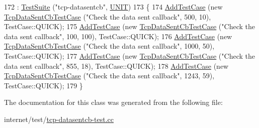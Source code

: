 \begin{DoxyCode}
172     : \hyperlink{classns3_1_1TestSuite_a904b0c40583b744d30908aeb94636d1a}{TestSuite} (\textcolor{stringliteral}{"tcp-datasentcb"}, \hyperlink{classns3_1_1TestSuite_a1ebfcab34ec8161e085e8e3a1855eae0a3885375a3787abf60431f8454b3cadbd}{UNIT})
173   \{
174     \hyperlink{classns3_1_1TestCase_a3718088e3eefd5d6454569d2e0ddd835}{AddTestCase} (\textcolor{keyword}{new} \hyperlink{classTcpDataSentCbTestCase}{TcpDataSentCbTestCase} (\textcolor{stringliteral}{"Check the data sent callback"},
       500, 10), TestCase::QUICK);
175     \hyperlink{classns3_1_1TestCase_a3718088e3eefd5d6454569d2e0ddd835}{AddTestCase} (\textcolor{keyword}{new} \hyperlink{classTcpDataSentCbTestCase}{TcpDataSentCbTestCase} (\textcolor{stringliteral}{"Check the data sent callback"},
       100, 100), TestCase::QUICK);
176     \hyperlink{classns3_1_1TestCase_a3718088e3eefd5d6454569d2e0ddd835}{AddTestCase} (\textcolor{keyword}{new} \hyperlink{classTcpDataSentCbTestCase}{TcpDataSentCbTestCase} (\textcolor{stringliteral}{"Check the data sent callback"},
       1000, 50), TestCase::QUICK);
177     \hyperlink{classns3_1_1TestCase_a3718088e3eefd5d6454569d2e0ddd835}{AddTestCase} (\textcolor{keyword}{new} \hyperlink{classTcpDataSentCbTestCase}{TcpDataSentCbTestCase} (\textcolor{stringliteral}{"Check the data sent callback"},
       855, 18), TestCase::QUICK);
178     \hyperlink{classns3_1_1TestCase_a3718088e3eefd5d6454569d2e0ddd835}{AddTestCase} (\textcolor{keyword}{new} \hyperlink{classTcpDataSentCbTestCase}{TcpDataSentCbTestCase} (\textcolor{stringliteral}{"Check the data sent callback"},
       1243, 59), TestCase::QUICK);
179   \}
\end{DoxyCode}


The documentation for this class was generated from the following file\+:\begin{DoxyCompactItemize}
\item 
internet/test/\hyperlink{tcp-datasentcb-test_8cc}{tcp-\/datasentcb-\/test.\+cc}\end{DoxyCompactItemize}
